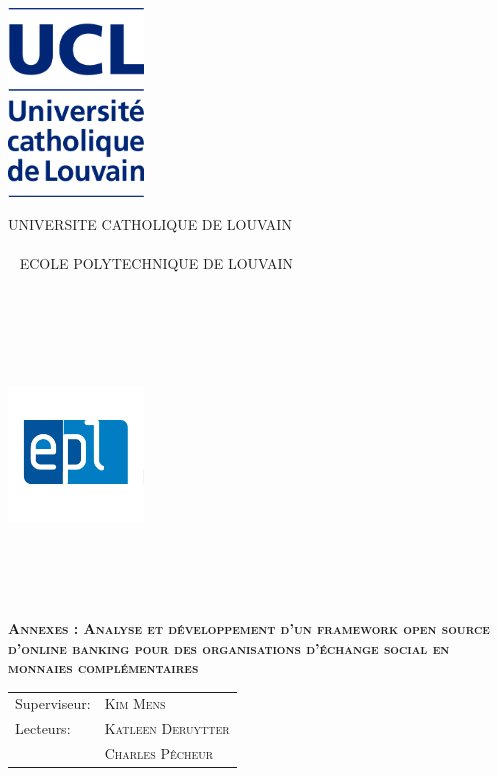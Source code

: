 \documentclass[british]{article}
\renewcommand\title{Annexes : Analyse et développement d'un framework open source d'online banking pour des organisations d'échange social en monnaies complémentaires}
\newcommand\supervisor{ \textsc{Kim Mens}}
\newcommand\readerone{ \textsc{Katleen Deruytter}}
\newcommand\readertwo{ \textsc{Charles Pêcheur}}
\begin{document}
\thispagestyle{empty}
\noindent\begin{minipage}{.25\textwidth}
\noindent\includegraphics[width=3.6cm]{UCL.jpg}
\end{minipage}
\begin{minipage}{.5\textwidth}
\begin{center}
UNIVERSITE CATHOLIQUE DE LOUVAIN
\\~\\~
ECOLE POLYTECHNIQUE DE LOUVAIN
\\~\\~\\~\\~\\~
\end{center}
\end{minipage}
\begin{minipage}{.25\textwidth}
\hfill\includegraphics[width=3.6cm]{EPL.jpg}
\\~\\~\\~\\~
\end{minipage}
\vspace{4.5cm}
\begin{center}
\bfseries{\scshape{\Huge{\title}}}
\end{center}
\vspace{4.5cm}
\begin{minipage}{.5\textwidth}
\begin{tabular}{ll}
Superviseur: & \supervisor
\\ Lecteurs: & \readerone 
\\          & \readertwo 
\end{tabular} 
\\~\\~
\end{minipage}
\end{document}
